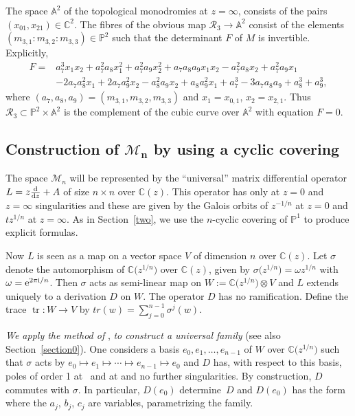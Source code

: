 \documentclass[pdftex]{sigma}
\numberwithin{equation}{section}
\begin{document}
The space $\mathbb{A}^2$ of the topological monodromies at $z=\infty$, consists of the pairs $(x_{01},x_{21})\in \mathbb{C}^2$. The fibres of the obvious map $\mathcal{R}_3\rightarrow \mathbb{A}^2$ consist of the elements
$(m_{3,1}:m_{3,2}:m_{3,3})\in \mathbb{P}^2$ such that the determinant $F$ of $M$ is invertible. Explicitly,
 \begin{align*}
 F={}&a_7^3x_1x_2 + a_7^2a_8x_1^2 + a_7^2a_9x_2^2 + a_7a_8a_9x_1x_2
-a_7^2a_8x_2 + a_7^2a_9x_1 \\ &- 2a_7a_8^2x_1 + 2a_7a_9^2x_2 - a_8^2a_9x_2
 + a_8a_9^2x_1 + a_7^3 - 3a_7a_8a_9 + a_8^3 + a_9^3,
 \end{align*}
where $(a_7,a_8,a_9)=(m_{3,1},m_{3,2},m_{3,3})$ and $x_1=x_{0,1}$, $ x_2=x_{2,1}$.
Thus $\mathcal{R}_3\subset \mathbb{P}^2\times \mathbb{A}^2$ is the complement of the cubic curve
over $\mathbb{A}^2$ with equation $F=0$.

\subsection[Construction of M\_n by using a cyclic covering]{Construction of $\boldsymbol{\mathcal{M}_n}$ by using a cyclic covering}

The space $\mathcal{M}_n$ will be represented by the ``universal'' matrix differential operator
 $L=z\frac{{\rm d}}{{\rm d}z}+A$ of size $n\times n$ over $\mathbb{C}(z)$. This operator has only at $z=0$ and $z=\infty$ singularities
and these are given by the Galois orbits of $z^{-1/n}$ at $z=0$ and $tz^{1/n}$ at $z=\infty$.
As in Section~\ref{two}, we use the $n$-cyclic covering of $\mathbb{P}^1$ to produce explicit formulas.

Now $L$ is seen as a map on a vector space $V$ of dimension $n$ over $\mathbb{C}(z)$. Let $\sigma$ denote
the automorphism of $\mathbb{C}\bigl(z^{1/n}\bigr)$ over $\mathbb{C}(z)$, given by $\sigma \bigl(z^{1/n}\bigr)=\omega z^{1/n}$ with $\omega={\rm e}^{2\pi {\rm i} /n}$.
Then $\sigma$ acts as semi-linear map on $W:=\mathbb{C}\bigl(z^{1/n}\bigr)\otimes V$ and $L$ extends uniquely to
a derivation $D$ on $W$. The operator $D$ has no ramification.
Define the trace $\operatorname{tr}\colon W\rightarrow V$ by $tr(w)=\sum _{j=0}^{n-1}\sigma^j(w)$.

{\it We apply the method of} \cite[Chapter~12]{vdP-Sa}, {\it to construct a universal family} (see also
Section~\ref{section0}).
 One considers a basis $e_0,e_1,\dots ,e_{n-1}$ of $W$ over $\mathbb{C}\bigl(z^{1/n}\bigr)$ such that $\sigma$ acts by
 $e_0\mapsto e_1 \mapsto \cdots \mapsto e_{n-1}\mapsto e_0$ and $D$ has, with respect to this basis, poles of order 1
 at~ and at  and no further singularities. By construction, $D$ commutes with
$\sigma$. In particular, $D(e_0)$ determine~$D$ and $D(e_0)$ has the form
 where the $a_j$, $b_j$, $c_j$ are variables, parametrizing the family.
\end{document}
